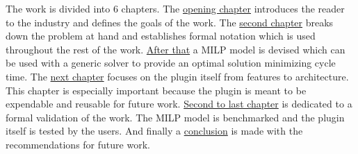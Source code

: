 The work is divided into 6 chapters. The \href{ch:introduction}{opening chapter} introduces the reader to the industry and defines the goals of the work. The \href{ch:problem_statement}{second chapter} breaks down the problem at hand and establishes formal notation which is used throughout the rest of the work. \href{ch:milp_model}{After that} a MILP model is devised which can be used with a generic solver to provide an optimal solution minimizing cycle time. The \href{ch:integration}{next chapter} focuses on the plugin itself from features to architecture. This chapter is especially important because the plugin is meant to be expendable and reusable for future work. \href{ch:experiments}{Second to last chapter} is dedicated to a formal validation of the work. The MILP model is benchmarked and the plugin itself is tested by the users. And finally a \href{ch:conclusion}{conclusion} is made with the recommendations for future work.    